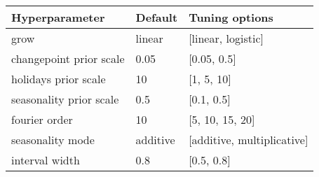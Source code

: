 \begin{tabular}{|l|l|l|} 
\hline
\textbf{Hyperparameter}& \textbf{Default} & \textbf{Tuning options}\\
\hline
grow & linear & [linear, logistic] \\
\hline
changepoint prior scale & 0.05 & [0.05, 0.5] \\
\hline
holidays prior scale & 10 & [1, 5, 10] \\
\hline
seasonality prior scale & 0.5 & [0.1, 0.5] \\
\hline
fourier order & 10 & [5, 10, 15, 20] \\
\hline
seasonality mode & additive & [additive, multiplicative] \\
\hline
interval width & 0.8 & [0.5, 0.8] \\
\hline
\end{tabular}
